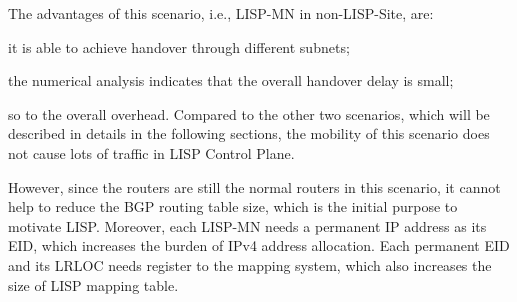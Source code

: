 The advantages of this scenario, i.e., LISP-MN in non-LISP-Site, are: 
\begin{inparaenum}[1)]
	\item it is able to achieve handover through different subnets;
	\item the numerical analysis indicates that the overall handover delay is small;
	\item so to the overall overhead. Compared to the other two scenarios, which will be described in details in the following sections, the mobility of this scenario does not cause lots of traffic in LISP Control Plane.
\end{inparaenum}
However, since the routers are still the normal routers in this scenario, it cannot help to reduce the BGP routing table size, which is the initial purpose to motivate LISP. Moreover, each LISP-MN needs a permanent IP address as its EID, which increases the burden of IPv4 address allocation. Each permanent EID and its LRLOC needs register to the mapping system, which also increases the size of LISP mapping table.

